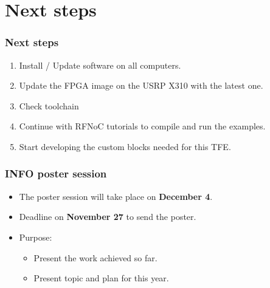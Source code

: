 \documentclass[11pt]{beamer}
\begin{document}

\section{Next steps}

\begin{frame}
    \frametitle{Next steps}
    \begin{enumerate}
        \item Install / Update software on all computers.
        \item Update the FPGA image on the USRP X310 with the latest one.
        \item Check toolchain
        \item Continue with RFNoC tutorials to compile and run the examples.
        \item Start developing the custom blocks needed for this TFE.
    \end{enumerate}
\end{frame}

\begin{frame}
    \frametitle{INFO poster session}
    \begin{itemize}
        \item The poster session will take place on \textbf{December 4}.
        \item Deadline on \textbf{November 27} to send the poster.
        \item Purpose:
        \begin{itemize}
            \item  Present the work achieved so far.
            \item Present topic and plan for this year.
        \end{itemize}
    \end{itemize}
\end{frame}
\end{document}
